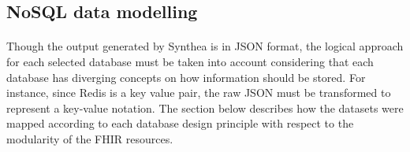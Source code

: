 \documentclass[5p]{elsarticle}
\begin{document}
\subsection{NoSQL data modelling}
\paragraph{} \noindent Though the output generated by Synthea is in JSON format, the logical approach for each selected database must be taken into account considering that each database has diverging concepts on how information should be stored. For instance, since Redis is a key value pair, the raw JSON must be transformed to represent a key-value notation. The section below describes how the datasets were mapped according to each database design principle with respect to the modularity of the FHIR resources.
\end{document}
